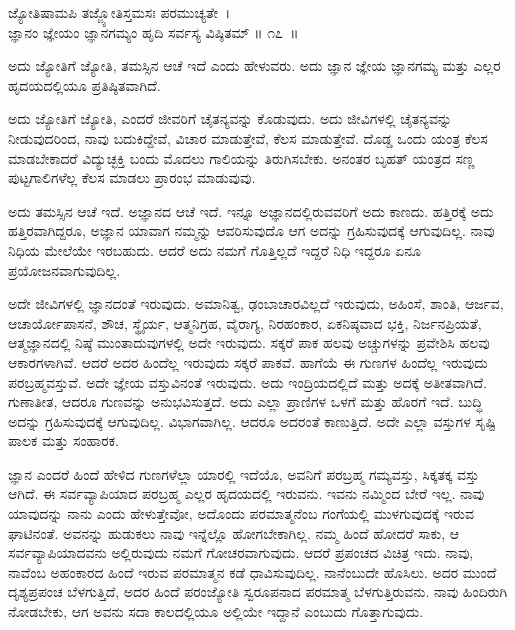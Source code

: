 \begin{shloka}
ಜ್ಯೋತಿಷಾಮಪಿ ತಜ್ಜ್ಯೋತಿಸ್ತಮಸಃ ಪರಮುಚ್ಯತೇ~।\\ಜ್ಞಾನಂ ಜ್ಞೇಯಂ ಜ್ಞಾನಗಮ್ಯಂ ಹೃದಿ ಸರ್ವಸ್ಯ ವಿಷ್ಠಿತಮ್ \hfill॥ ೧೭~॥
\end{shloka}

\begin{artha}
ಅದು ಜ್ಯೋತಿಗೆ ಜ್ಯೋತಿ, ತಮಸ್ಸಿನ ಆಚೆ ಇದೆ ಎಂದು ಹೇಳುವರು. ಅದು ಜ್ಞಾನ ಜ್ಞೇಯ ಜ್ಞಾನಗಮ್ಯ ಮತ್ತು ಎಲ್ಲರ ಹೃದಯದಲ್ಲಿಯೂ ಪ್ರತಿಷ್ಠಿತವಾಗಿದೆ.
\end{artha}

ಅದು ಜ್ಯೋತಿಗೆ ಜ್ಯೋತಿ, ಎಂದರೆ ಜೀವರಿಗೆ ಚೈತನ್ಯವನ್ನು ಕೊಡುವುದು. ಅದು ಜೀವಿಗಳಲ್ಲಿ ಚೈತನ್ಯವನ್ನು ನೀಡುವುದರಿಂದ, ನಾವು ಬದುಕಿದ್ದೇವೆ, ವಿಚಾರ ಮಾಡುತ್ತೇವೆ, ಕೆಲಸ ಮಾಡುತ್ತೇವೆ. ದೊಡ್ಡ ಒಂದು ಯಂತ್ರ ಕೆಲಸ ಮಾಡಬೇಕಾದರೆ ವಿದ್ಯುಚ್ಛಕ್ತಿ ಬಂದು ಮೊದಲು ಗಾಲಿಯನ್ನು ತಿರುಗಿಸಬೇಕು. ಅನಂತರ ಬೃಹತ್ ಯಂತ್ರದ ಸಣ್ಣ ಪುಟ್ಟಗಾಲಿಗಳೆಲ್ಲ ಕೆಲಸ ಮಾಡಲು ಪ್ರಾರಂಭ ಮಾಡುವುವು.

ಅದು ತಮಸ್ಸಿನ ಆಚೆ ಇದೆ. ಅಜ್ಞಾನದ ಆಚೆ ಇದೆ. ಇನ್ನೂ ಅಜ್ಞಾನದಲ್ಲಿರುವವರಿಗೆ ಅದು ಕಾಣದು. ಹತ್ತಿರಕ್ಕೆ ಅದು ಹತ್ತಿರವಾಗಿದ್ದರೂ, ಅಜ್ಞಾನ ಯಾವಾಗ ನಮ್ಮನ್ನು ಆವರಿಸುವುದೊ ಆಗ ಅದನ್ನು ಗ್ರಹಿಸುವುದಕ್ಕೆ ಆಗುವುದಿಲ್ಲ. ನಾವು ನಿಧಿಯ ಮೇಲೆಯೇ ಇರಬಹುದು. ಆದರೆ ಅದು ನಮಗೆ ಗೊತ್ತಿಲ್ಲದೆ ಇದ್ದರೆ ನಿಧಿ ಇದ್ದರೂ ಏನೂ ಪ್ರಯೋಜನವಾಗುವುದಿಲ್ಲ.

ಅದೇ ಜೀವಿಗಳಲ್ಲಿ ಜ್ಞಾನದಂತೆ ಇರುವುದು. ಅಮಾನಿತ್ವ, ಢಂಬಾಚಾರವಿಲ್ಲದೆ ಇರುವುದು, ಅಹಿಂಸೆ, ಶಾಂತಿ, ಆರ್ಜವ, ಆಚಾರ್ಯೋಪಾಸನೆ, ಶೌಚ, ಸ್ಥೈರ್ಯ, ಆತ್ಮನಿಗ್ರಹ, ವೈರಾಗ್ಯ, ನಿರಹಂಕಾರ, ಏಕನಿಷ್ಠವಾದ ಭಕ್ತಿ, ನಿರ್ಜನಪ್ರಿಯತೆ, ಆತ್ಮಜ್ಞಾನದಲ್ಲಿ ನಿಷ್ಠೆ ಮುಂತಾದುವುಗಳಲ್ಲಿ ಅದೇ ಇರುವುದು. ಸಕ್ಕರೆ ಪಾಕ ಹಲವು ಅಚ್ಚುಗಳನ್ನು ಪ್ರವೇಶಿಸಿ ಹಲವು ಆಕಾರಗಳಾಗಿವೆ. ಆದರೆ ಅದರ ಹಿಂದೆಲ್ಲ ಇರುವುದು ಸಕ್ಕರೆ ಪಾಕವೆ. ಹಾಗೆಯೆ ಈ ಗುಣಗಳ ಹಿಂದೆಲ್ಲ ಇರುವುದು ಪರಬ್ರಹ್ಮವಸ್ತುವೆ. ಅದೇ ಜ್ಞೇಯ ವಸ್ತುವಿನಂತೆ ಇರುವುದು. ಅದು ಇಂದ್ರಿಯದಲ್ಲಿದೆ ಮತ್ತು ಅದಕ್ಕೆ ಅತೀತವಾಗಿದೆ. ಗುಣಾತೀತ, ಆದರೂ ಗುಣವನ್ನು ಅನುಭವಿಸುತ್ತದೆ. ಅದು ಎಲ್ಲಾ ಪ್ರಾಣಿಗಳ ಒಳಗೆ ಮತ್ತು ಹೊರಗೆ ಇದೆ. ಬುದ್ಧಿ ಅದನ್ನು ಗ್ರಹಿಸುವುದಕ್ಕೆ ಆಗುವುದಿಲ್ಲ. ವಿಭಾಗವಾಗಿಲ್ಲ. ಆದರೂ ಅದರಂತೆ ಕಾಣುತ್ತಿದೆ. ಅದೇ ಎಲ್ಲಾ ವಸ್ತುಗಳ ಸೃಷ್ಟಿ ಪಾಲಕ ಮತ್ತು ಸಂಹಾರಕ.

ಜ್ಞಾನ ಎಂದರೆ ಹಿಂದೆ ಹೇಳಿದ ಗುಣಗಳೆಲ್ಲಾ ಯಾರಲ್ಲಿ ಇದೆಯೊ, ಅವನಿಗೆ ಪರಬ್ರಹ್ಮ ಗಮ್ಯವಸ್ತು, ಸಿಕ್ಕತಕ್ಕ ವಸ್ತು ಆಗಿದೆ. ಈ ಸರ್ವವ್ಯಾಪಿಯಾದ ಪರಬ್ರಹ್ಮ ಎಲ್ಲರ ಹೃದಯದಲ್ಲಿ ಇರುವನು. ಇವನು ನಮ್ಮಿಂದ ಬೇರೆ ಇಲ್ಲ. ನಾವು ಯಾವುದನ್ನು ನಾನು ಎಂದು ಹೇಳುತ್ತೇವೋ, ಅದೊಂದು ಪರಮಾತ್ಮನೆಂಬ ಗಂಗೆಯಲ್ಲಿ ಮುಳಗುವುದಕ್ಕೆ ಇರುವ ಘಾಟಿನಂತೆ. ಅವನನ್ನು ಹುಡುಕಲು ನಾವು ಇನ್ನೆಲ್ಲೊ ಹೋಗಬೇಕಾಗಿಲ್ಲ. ನಮ್ಮ ಹಿಂದೆ ಹೋದರೆ ಸಾಕು, ಆ ಸರ್ವವ್ಯಾಪಿಯಾದವನು ಅಲ್ಲಿರುವುದು ನಮಗೆ ಗೋಚರವಾಗುವುದು. ಆದರೆ ಪ್ರಪಂಚದ ವಿಚಿತ್ರ ಇದು. ನಾವು, ನಾವೆಂಬ ಅಹಂಕಾರದ ಹಿಂದೆ ಇರುವ ಪರಮಾತ್ಮನ ಕಡೆ ಧಾವಿಸುವುದಿಲ್ಲ. ನಾನೆಂಬುದೇ ಹೊಸಿಲು. ಅದರ ಮುಂದೆ ದೃಶ್ಯಪ್ರಪಂಚ ಬೆಳಗುತ್ತಿದೆ, ಅದರ ಹಿಂದೆ ಪರಂಜ್ಯೋತಿ ಸ್ವರೂಪನಾದ ಪರಮಾತ್ಮ ಬೆಳಗುತ್ತಿರುವನು. ನಾವು ಹಿಂದಿರುಗಿ ನೋಡಬೇಕು, ಆಗ ಅವನು ಸದಾ ಕಾಲದಲ್ಲಿಯೂ ಅಲ್ಲಿಯೇ ಇದ್ದಾನೆ ಎಂಬುದು ಗೊತ್ತಾಗುವುದು.

